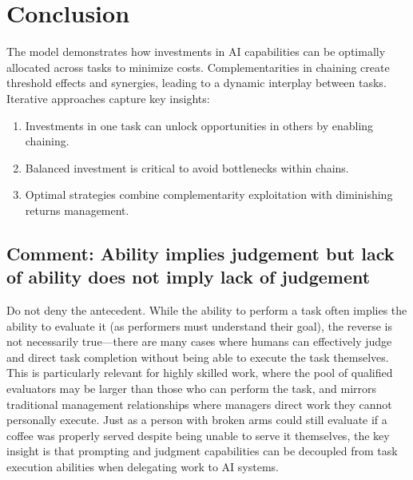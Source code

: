 \documentclass{article}
\begin{document}
\section{Conclusion}
The model demonstrates how investments in AI capabilities can be optimally allocated across tasks to minimize costs. Complementarities in chaining create threshold effects and synergies, leading to a dynamic interplay between tasks. Iterative approaches capture key insights:
\begin{enumerate}
    \item Investments in one task can unlock opportunities in others by enabling chaining.
    \item Balanced investment is critical to avoid bottlenecks within chains.
    \item Optimal strategies combine complementarity exploitation with diminishing returns management.
\end{enumerate}






\begin{tcolorbox}
\subsection{Comment: Ability implies judgement but lack of ability does not imply lack of judgement}
Do not deny the antecedent.
While the ability to perform a task often implies the ability to evaluate it (as performers must understand their goal), the reverse is not necessarily true---there are many cases where humans can effectively judge and direct task completion without being able to execute the task themselves. 
This is particularly relevant for highly skilled work, where the pool of qualified evaluators may be larger than those who can perform the task, and mirrors traditional management relationships where managers direct work they cannot personally execute. 
Just as a person with broken arms could still evaluate if a coffee was properly served despite being unable to serve it themselves, the key insight is that prompting and judgment capabilities can be decoupled from task execution abilities when delegating work to AI systems.
\end{tcolorbox}
\end{document}
